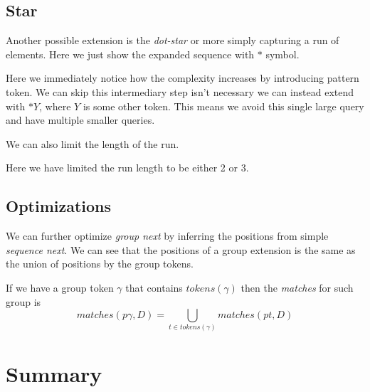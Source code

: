 \begin{figure}[H]
	
\end{figure}

\subsection{Star}

Another possible extension is the \emph{dot-star} or more simply capturing a run of elements. Here we just show the expanded sequence with $*$ symbol.

\begin{figure}[H]
	
\end{figure}

Here we immediately notice how the complexity increases by introducing pattern token.  We can skip this intermediary step isn't necessary we can instead extend with $*Y$, where $Y$ is some other token. This means we avoid this single large query and have multiple smaller queries.

\begin{figure}[H]
	
\end{figure}

We can also limit the length of the run.

\begin{figure}[H]
	
\end{figure}

Here we have limited the run length to be either 2 or 3.

\subsection{Optimizations}

We can further optimize \emph{group next} by inferring the positions from simple \emph{sequence next}. We can see that the positions of a group extension is the same as the union of positions by the group tokens.

If we have a group token $\gamma$ that contains $tokens(\gamma)$ then the \emph{matches} for such group is $$matches(p\gamma, D) = \bigcup_{t \in tokens(\gamma)} matches(pt, D) $$

\section{Summary}


